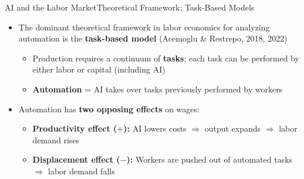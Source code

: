 \documentclass[hyperref={pdfpagelabels=false}]{beamer}
\begin{document}
\begin{frame}{AI and the Labor Market}{Theoretical Framework: Task-Based Models}
	\begin{itemize}
		\item The dominant theoretical framework in labor economics for analyzing automation is the \textbf{task-based model} (Acemoglu \& Restrepo, 2018, 2022)
		\vspace{0.2cm}
		\begin{itemize}
			\item Production requires a continuum of \textbf{tasks}; each task can be performed by either labor or capital (including AI)
			\vspace{0.1cm}
			\item \textbf{Automation} = AI takes over tasks previously performed by workers
		\end{itemize}
		\vspace{0.3cm}
		\item Automation has \textbf{two opposing effects} on wages:
		\vspace{0.1cm}
		\begin{itemize}
			\item \textbf{Productivity effect ($+$):} AI lowers costs $\Rightarrow$ output expands $\Rightarrow$ labor demand rises
			\vspace{0.1cm}
			\item \textbf{Displacement effect ($-$):} Workers are pushed out of automated tasks $\Rightarrow$ labor demand falls
		\end{itemize}
	\end{itemize}
\end{frame}
\end{document}
